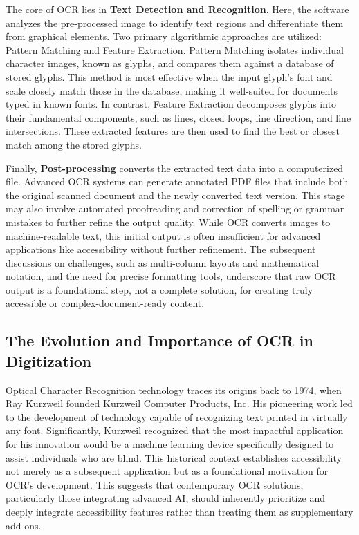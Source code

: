 The core of OCR lies in \textbf{Text Detection and Recognition}. Here, the software analyzes the pre-processed image to identify text regions and differentiate them from graphical elements. Two primary algorithmic approaches are utilized: Pattern Matching and Feature Extraction. Pattern Matching isolates individual character images, known as glyphs, and compares them against a database of stored glyphs. This method is most effective when the input glyph's font and scale closely match those in the database, making it well-suited for documents typed in known fonts. In contrast, Feature Extraction decomposes glyphs into their fundamental components, such as lines, closed loops, line direction, and line intersections. These extracted features are then used to find the best or closest match among the stored glyphs.

Finally, \textbf{Post-processing} converts the extracted text data into a computerized file. Advanced OCR systems can generate annotated PDF files that include both the original scanned document and the newly converted text version. This stage may also involve automated proofreading and correction of spelling or grammar mistakes to further refine the output quality. While OCR converts images to machine-readable text, this initial output is often insufficient for advanced applications like accessibility without further refinement. The subsequent discussions on challenges, such as multi-column layouts and mathematical notation, and the need for precise formatting tools, underscore that raw OCR output is a foundational step, not a complete solution, for creating truly accessible or complex-document-ready content.

\subsection{The Evolution and Importance of OCR in Digitization}

Optical Character Recognition technology traces its origins back to 1974, when Ray Kurzweil founded Kurzweil Computer Products, Inc. His pioneering work led to the development of technology capable of recognizing text printed in virtually any font. Significantly, Kurzweil recognized that the most impactful application for his innovation would be a machine learning device specifically designed to assist individuals who are blind. This historical context establishes accessibility not merely as a subsequent application but as a foundational motivation for OCR's development. This suggests that contemporary OCR solutions, particularly those integrating advanced AI, should inherently prioritize and deeply integrate accessibility features rather than treating them as supplementary add-ons.

